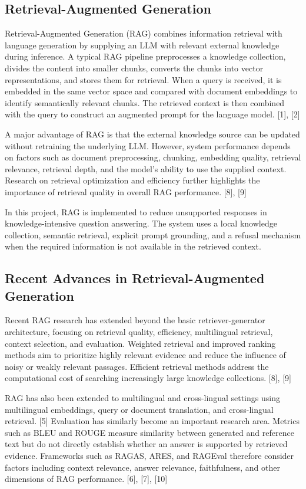 \documentclass[conference]{IEEEtran}
\begin{document}
\subsection{Retrieval-Augmented Generation}
Retrieval-Augmented Generation (RAG) combines information retrieval with language generation by supplying an LLM with relevant external knowledge during inference. A typical RAG pipeline preprocesses a knowledge collection, divides the content into smaller chunks, converts the chunks into vector representations, and stores them for retrieval. When a query is received, it is embedded in the same vector space and compared with document embeddings to identify semantically relevant chunks. The retrieved context is then combined with the query to construct an augmented prompt for the language model. [1], [2]

A major advantage of RAG is that the external knowledge source can be updated without retraining the underlying LLM. However, system performance depends on factors such as document preprocessing, chunking, embedding quality, retrieval relevance, retrieval depth, and the model's ability to use the supplied context. Research on retrieval optimization and efficiency further highlights the importance of retrieval quality in overall RAG performance. [8], [9]

In this project, RAG is implemented to reduce unsupported responses in knowledge-intensive question answering. The system uses a local knowledge collection, semantic retrieval, explicit prompt grounding, and a refusal mechanism when the required information is not available in the retrieved context.
\subsection{Recent Advances in Retrieval-Augmented Generation}
Recent RAG research has extended beyond the basic retriever-generator architecture, focusing on retrieval quality, efficiency, multilingual retrieval, context selection, and evaluation. Weighted retrieval and improved ranking methods aim to prioritize highly relevant evidence and reduce the influence of noisy or weakly relevant passages. Efficient retrieval methods address the computational cost of searching increasingly large knowledge collections. [8], [9]

RAG has also been extended to multilingual and cross-lingual settings using multilingual embeddings, query or document translation, and cross-lingual retrieval. [5] Evaluation has similarly become an important research area. Metrics such as BLEU and ROUGE measure similarity between generated and reference text but do not directly establish whether an answer is supported by retrieved evidence. Frameworks such as RAGAS, ARES, and RAGEval therefore consider factors including context relevance, answer relevance, faithfulness, and other dimensions of RAG performance. [6], [7], [10]
\end{document}
